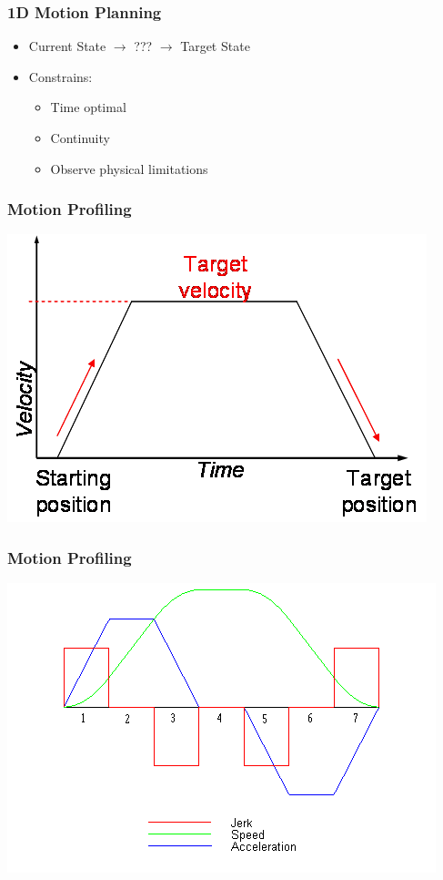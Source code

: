 \documentclass{beamer}
\begin{document}
\begin{frame}
	\frametitle{1D Motion Planning}
	\begin{itemize}
		\item Current State $\rightarrow$ ??? $\rightarrow$ Target State
		\item Constrains: 
			\begin{itemize}
				\item Time optimal
				\item Continuity
				\item Observe physical limitations
			\end{itemize}
	\end{itemize}
\end{frame}

\begin{frame}
	\frametitle{Motion Profiling}
	\includegraphics[width=.9\textwidth]{trap.png}
\end{frame}

\begin{frame}
	\frametitle{Motion Profiling}
	\includegraphics[width=.9\textwidth]{mp.png}
\end{frame}
\end{document}

